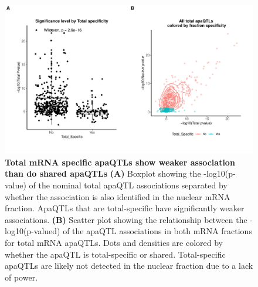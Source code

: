 \begin{figure}[!htb]
\centering
\includegraphics[width=5in]{img/ch02/Fig2_figuresupplement6.pdf}
\caption[Total mRNA specific apaQTLs show weaker association than do shared apaQTLs]{\textbf{Total mRNA specific apaQTLs show weaker association than do shared apaQTLs} {\bf (A)} Boxplot showing the -log10(p-value) of the nominal total apaQTL associations separated by whether the association is also identified in the nuclear mRNA fraction. ApaQTLs that are total-specific have significantly weaker associations. {\bf (B)} Scatter plot showing the relationship between the -log10(p-valued) of the apaQTL associations in both mRNA fractions for total mRNA apaQTLs. Dots and densities are colored by whether the apaQTL is total-specific or shared. Total-specific apaQTLs are likely not detected in the nuclear fraction due to a lack of power.}
\label{fig:totSpeWeak}
\end{figure}
\clearpage

